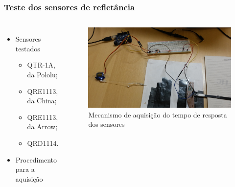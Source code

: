 \begin{frame}
\frametitle{Teste dos sensores de refletância}
\begin{columns}

	\begin{itemize}
		\item Sensores testados
		\begin{itemize}
			\item QTR-1A, da Pololu;
			\item QRE1113, da China;
			\item QRE1113, da Arrow;
			\item QRD1114.
		\end{itemize}
		\item Procedimento para a aquisição
	\end{itemize}		
	
	
	\begin{figure}[th]
	\centering
	\captionsetup{width=\textwidth,font=footnotesize,textfont=bf}
	\includegraphics[width=\textwidth,keepaspectratio]{Figuras/mecanismo.jpg}
	\caption{Mecanismo de aquisição do tempo de resposta dos sensores}
	\end{figure}
	
\end{columns}
\end{frame}

